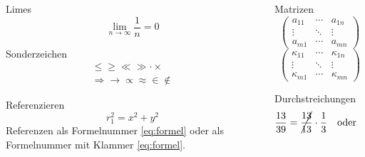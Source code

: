 \documentclass[9pt]{beamer}
\begin{document}
\begin{frame}
	\begin{columns}
		\begin{column}{0.49\textwidth}
			\begin{exampleblock}{Limes}
				\begin{equation*}\lim_{n \to \infty}\frac{1}{n}=0\end{equation*}
			\end{exampleblock}
			\begin{exampleblock}{Sonderzeichen}
                \begin{align*}
                    \leq \geq \ll \gg \cdot \times\\
                    \Rightarrow \rightarrow \propto \approx \in \not\in
                \end{align*}
			\end{exampleblock}
			\begin{exampleblock}{Referenzieren}
				\begin{equation}
					r_1^2 = x^2 + y^2
					\label{eq:formel}
				\end{equation}
				Referenzen als Formelnummer \ref{eq:formel} oder
				als	Formelnummer mit Klammer \eqref{eq:formel}.
			\end{exampleblock}
		\end{column}
		\begin{column}{0.49\textwidth}
			\begin{exampleblock}{Matrizen}
				\begin{equation*}
					\left(
						\begin{array}{ccc}
							a_{11} & \cdots & a_{1n} \\
							\vdots & \ddots & \vdots \\
							a_{m1} & \cdots & a_{mn}
						\end{array}
					\right)
				\end{equation*}
				\begin{equation*}
					\begin{pmatrix}
						\kappa_{11} & \cdots & \kappa_{1n} \\
						\vdots      & \ddots & \vdots      \\
						\kappa_{m1} & \cdots & \kappa_{mn}
					\end{pmatrix}
				\end{equation*}
			\end{exampleblock}
			\begin{exampleblock}{Durchstreichungen}
				\begin{equation*}
					\frac{13}{39} = \cancel{{\frac{13}{13}}} \cdot \frac{1}{3}
					\quad\text{oder}\quad
					\frac{13}{39} = \frac{\cancel{13} \cdot 1}{\cancel{13} \cdot 3}
				\end{equation*}
			\end{exampleblock}
		\end{column}
	\end{columns}
\end{frame}
\end{document}
